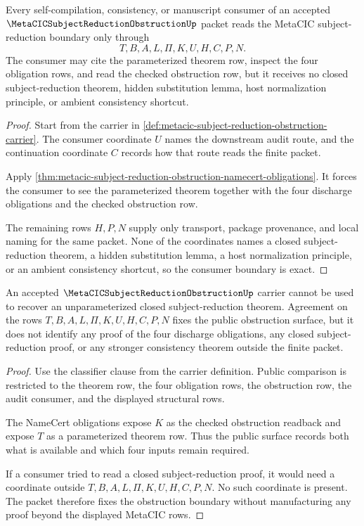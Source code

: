 \begin{theorem}
\label{thm:metacic-subject-reduction-obstruction-consumer-boundary}
Every self-compilation, consistency, or manuscript consumer of an accepted $\MetaCICSubjectReductionObstructionUp$ packet reads the MetaCIC subject-reduction boundary only through
$$
T,B,A,L,\Pi,K,U,H,C,P,N.
$$
The consumer may cite the parameterized theorem row, inspect the four obligation rows, and read the checked obstruction row, but it receives no closed subject-reduction theorem, hidden substitution lemma, host normalization principle, or ambient consistency shortcut.
\end{theorem}
\begin{proof}
Start from the carrier in \autoref{def:metacic-subject-reduction-obstruction-carrier}. The consumer coordinate $U$ names the downstream audit route, and the continuation coordinate $C$ records how that route reads the finite packet.

Apply \autoref{thm:metacic-subject-reduction-obstruction-namecert-obligations}. It forces the consumer to see the parameterized theorem together with the four discharge obligations and the checked obstruction row.

The remaining rows $H,P,N$ supply only transport, package provenance, and local naming for the same packet. None of the coordinates names a closed subject-reduction theorem, a hidden substitution lemma, a host normalization principle, or an ambient consistency shortcut, so the consumer boundary is exact.
\end{proof}

\begin{theorem}
\label{thm:metacic-subject-reduction-obstruction-no-escape}
An accepted $\MetaCICSubjectReductionObstructionUp$ carrier cannot be used to recover an unparameterized closed subject-reduction theorem. Agreement on the rows $T,B,A,L,\Pi,K,U,H,C,P,N$ fixes the public obstruction surface, but it does not identify any proof of the four discharge obligations, any closed subject-reduction proof, or any stronger consistency theorem outside the finite packet.
\end{theorem}
\begin{proof}
Use the classifier clause from the carrier definition. Public comparison is restricted to the theorem row, the four obligation rows, the obstruction row, the audit consumer, and the displayed structural rows.

The NameCert obligations expose $K$ as the checked obstruction readback and expose $T$ as a parameterized theorem row. Thus the public surface records both what is available and which four inputs remain required.

If a consumer tried to read a closed subject-reduction proof, it would need a coordinate outside $T,B,A,L,\Pi,K,U,H,C,P,N$. No such coordinate is present. The packet therefore fixes the obstruction boundary without manufacturing any proof beyond the displayed MetaCIC rows.
\end{proof}


